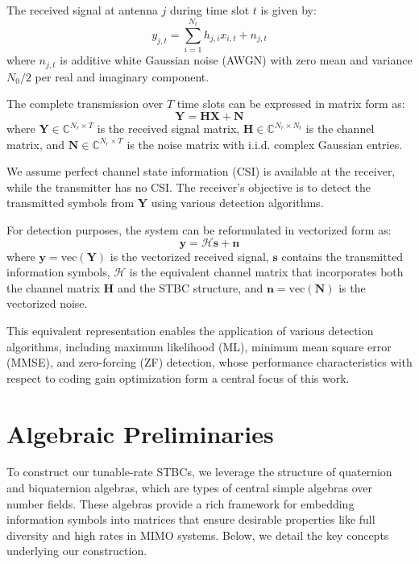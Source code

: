 \documentclass[twocolumn,conference]{IEEEtran}
\begin{document}
The received signal at antenna $j$ during time slot $t$ is given by:
\begin{equation}
y_{j,t} = \sum_{i=1}^{N_t} h_{j,i} x_{i,t} + n_{j,t}
\end{equation}
where $n_{j,t}$ is additive white Gaussian noise (AWGN) with zero mean and variance $N_0/2$ per real and imaginary component.

The complete transmission over $T$ time slots can be expressed in matrix form as:
\begin{equation} \label{eq:system_model_matrix}
\mathbf{Y} = \mathbf{H}\mathbf{X} + \mathbf{N}
\end{equation}
where $\mathbf{Y} \in \mathbb{C}^{N_r \times T}$ is the received signal matrix, $\mathbf{H} \in \mathbb{C}^{N_r \times N_t}$ is the channel matrix, and $\mathbf{N} \in \mathbb{C}^{N_r \times T}$ is the noise matrix with i.i.d. complex Gaussian entries.

We assume perfect channel state information (CSI) is available at the receiver, while the transmitter has no CSI. 
The receiver's objective is to detect the transmitted symbols from $\mathbf{Y}$ using various detection algorithms.

For detection purposes, the system can be reformulated in vectorized form as:
\begin{equation}
\mathbf{y} = \mathcal{H}\mathbf{s} + \mathbf{n}
\end{equation}
where $\mathbf{y} = \text{vec}(\mathbf{Y})$ is the vectorized received signal, $\mathbf{s}$ contains the transmitted information symbols, $\mathcal{H}$ is the equivalent channel matrix that incorporates both the channel matrix $\mathbf{H}$ and the STBC structure, and $\mathbf{n} = \text{vec}(\mathbf{N})$ is the vectorized noise.

This equivalent representation enables the application of various detection algorithms, including maximum likelihood (ML), minimum mean square error (MMSE), and zero-forcing (ZF) detection, whose performance characteristics with respect to coding gain optimization form a central focus of this work.

\section{Algebraic Preliminaries}
To construct our tunable-rate STBCs, we leverage the structure of quaternion and biquaternion algebras, which are types of central simple algebras over number fields. 
These algebras provide a rich framework for embedding information symbols into matrices that ensure desirable properties like full diversity and high rates in MIMO systems. 
Below, we detail the key concepts underlying our construction.
\end{document}
